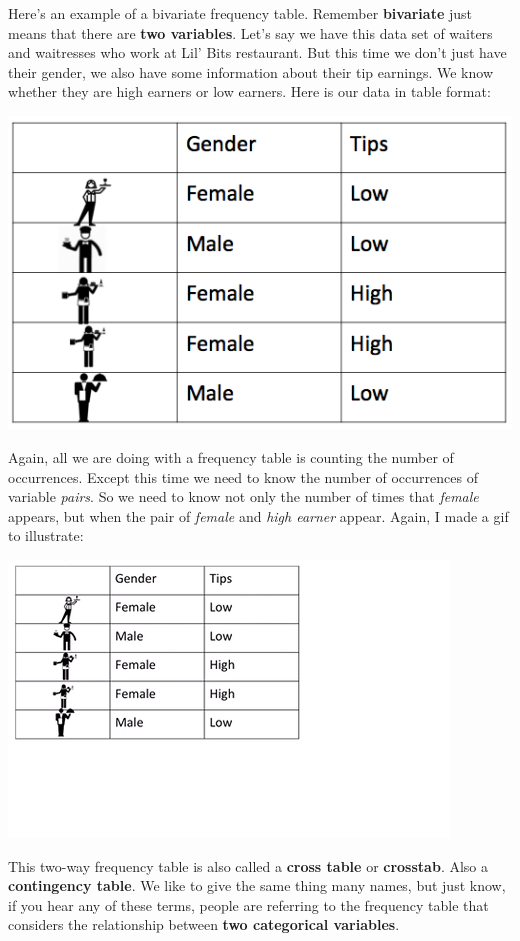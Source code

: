 \documentclass[
]{book}
\begin{document}
Here's an example of a bivariate frequency table. Remember \textbf{bivariate} just means that there are \textbf{two variables}. Let's say we have this data set of waiters and waitresses who work at Lil' Bits restaurant. But this time we don't just have their gender, we also have some information about their tip earnings. We know whether they are high earners or low earners. Here is our data in table format:

\includegraphics{imgs/waiter_height_and_tip.png}

Again, all we are doing with a frequency table is counting the number of occurrences. Except this time we need to know the number of occurrences of variable \emph{pairs}. So we need to know not only the number of times that \emph{female} appears, but when the pair of \emph{female} and \emph{high earner} appear. Again, I made a gif to illustrate:

\includegraphics{imgs/bivar_freq_table_gif.gif}

This two-way frequency table is also called a \textbf{cross table} or \textbf{crosstab}. Also a \textbf{contingency table}. We like to give the same thing many names, but just know, if you hear any of these terms, people are referring to the frequency table that considers the relationship between \textbf{two categorical variables}.
\end{document}
